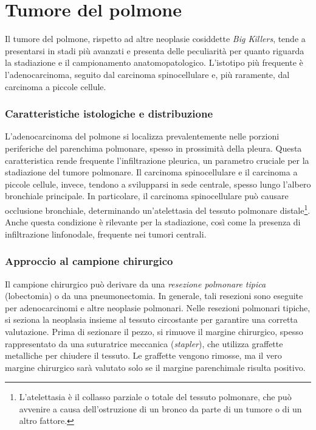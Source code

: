 \section{Tumore del polmone}
Il tumore del polmone, rispetto ad altre neoplasie cosiddette \textit{Big Killers}, tende a presentarsi in stadi più avanzati e presenta delle peculiarità per quanto riguarda la stadiazione e il campionamento anatomopatologico. L'istotipo più frequente è l'adenocarcinoma, seguito dal carcinoma spinocellulare e, più raramente, dal carcinoma a piccole cellule.

\subsubsection{Caratteristiche istologiche e distribuzione}
L'adenocarcinoma del polmone si localizza prevalentemente nelle porzioni periferiche del parenchima polmonare, spesso in prossimità della pleura. Questa caratteristica rende frequente l'infiltrazione pleurica, un parametro cruciale per la stadiazione del tumore polmonare. Il carcinoma spinocellulare e il carcinoma a piccole cellule, invece, tendono a svilupparsi in sede centrale, spesso lungo l'albero bronchiale principale. In particolare, il carcinoma spinocellulare può causare occlusione bronchiale, determinando un'atelettasia del tessuto polmonare distale\footnote{L'atelettasia è il collasso parziale o totale del tessuto polmonare, che può avvenire a causa dell'ostruzione di un bronco da parte di un tumore o di un altro fattore.}. Anche questa condizione è rilevante per la stadiazione, così come la presenza di infiltrazione linfonodale, frequente nei tumori centrali.

\subsubsection{Approccio al campione chirurgico}
Il campione chirurgico può derivare da una \textit{resezione polmonare tipica} (lobectomia) o da una pneumonectomia. In generale, tali resezioni sono eseguite per adenocarcinomi e altre neoplasie polmonari. Nelle resezioni polmonari tipiche, si seziona la neoplasia insieme al tessuto circostante per garantire una corretta valutazione. Prima di sezionare il pezzo, si rimuove il margine chirurgico, spesso rappresentato da una suturatrice meccanica (\textit{stapler}), che utilizza graffette metalliche per chiudere il tessuto. Le graffette vengono rimosse, ma il vero margine chirurgico sarà valutato solo se il margine parenchimale risulta positivo. 

